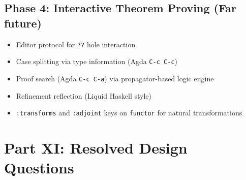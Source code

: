 \documentclass[11pt]{article}
\begin{document}
\subsection{Phase 4: Interactive Theorem Proving (Far future)}
\label{sec:org90b3558}

\begin{itemize}
\item Editor protocol for \texttt{??} hole interaction
\item Case splitting via type information (Agda \texttt{C-c C-c})
\item Proof search (Agda \texttt{C-c C-a}) via propagator-based logic engine
\item Refinement reflection (Liquid Haskell style)
\item \texttt{:transforms} and \texttt{:adjoint} keys on \texttt{functor} for natural transformations
\end{itemize}
\section{Part XI: Resolved Design Questions}
\label{sec:org34386d9}
\end{document}
